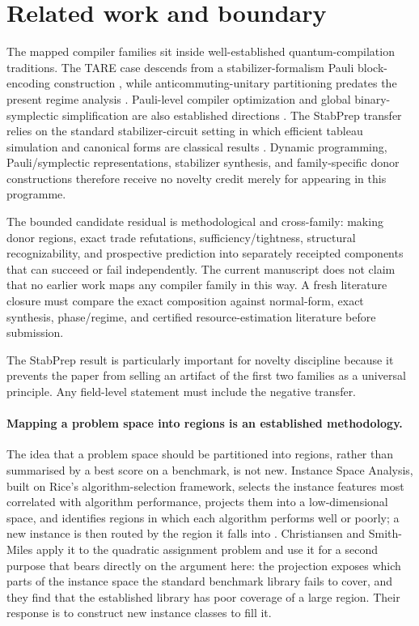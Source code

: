 \section{Related work and boundary}

The mapped compiler families sit inside well-established quantum-compilation traditions. The TARE case descends from a stabilizer-formalism Pauli block-encoding construction \cite{schillo2026blockencoding}, while anticommuting-unitary partitioning predates the present regime analysis \cite{izmaylov2020unitary}. Pauli-level compiler optimization and global binary-symplectic simplification are also established directions \cite{paykin2023pcoast,yang2026symphony}. The StabPrep transfer relies on the standard stabilizer-circuit setting in which efficient tableau simulation and canonical forms are classical results \cite{aaronson2004stabilizer}. Dynamic programming, Pauli/symplectic representations, stabilizer synthesis, and family-specific donor constructions therefore receive no novelty credit merely for appearing in this programme.

The bounded candidate residual is methodological and cross-family: making donor regions, exact trade refutations, sufficiency/tightness, structural recognizability, and prospective prediction into separately receipted components that can succeed or fail independently. The current manuscript does not claim that no earlier work maps any compiler family in this way. A fresh literature closure must compare the exact composition against normal-form, exact synthesis, phase/regime, and certified resource-estimation literature before submission.

The StabPrep result is particularly important for novelty discipline because it prevents the paper from selling an artifact of the first two families as a universal principle. Any field-level statement must include the negative transfer.

\paragraph{Mapping a problem space into regions is an established methodology.}
The idea that a problem space should be partitioned into regions, rather than summarised by a best score on a benchmark, is not new. Instance Space Analysis, built on Rice's algorithm-selection framework, selects the instance features most correlated with algorithm performance, projects them into a low-dimensional space, and identifies regions in which each algorithm performs well or poorly; a new instance is then routed by the region it falls into \cite{christiansen2025instancespace}. Christiansen and Smith-Miles apply it to the quadratic assignment problem and use it for a second purpose that bears directly on the argument here: the projection exposes which parts of the instance space the standard benchmark library fails to cover, and they find that the established library has poor coverage of a large region. Their response is to construct new instance classes to fill it.

